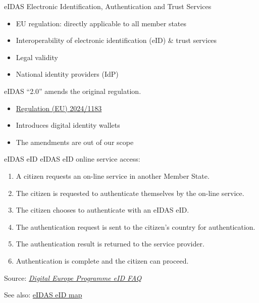 \begin{frame}{eIDAS}
  Electronic Identification, Authentication and Trust Services
  \begin{itemize}[<+(1)->]
    \item EU regulation: directly applicable to all member states
    \item Interoperability of electronic identification (eID) \& trust services
    \item Legal validity
    \item National identity providers (IdP)
  \end{itemize}

  \vfill

  \pause
  eIDAS \enquote{2.0} amends the original regulation.
  \begin{itemize}[<+(1)->]
    \item \href{https://eur-lex.europa.eu/eli/reg/2024/1183/oj}{Regulation (EU) 2024/1183}
    \item Introduces digital identity wallets
    \item The amendments are out of our scope
  \end{itemize}
\end{frame}

\begin{frame}{eIDAS eID}
  eIDAS eID online service access:
  \begin{enumerate}[<+(1)->]
    \item A citizen requests an on-line service in another Member State.
    \item The citizen is requested to authenticate themselves by the on-line service.
    \item The citizen chooses to authenticate with an eIDAS eID.
    \item The authentication request is sent to the citizen's country for authentication.
    \item The authentication result is returned to the service provider.
    \item Authentication is complete and the citizen can proceed.
  \end{enumerate}

  \pause
  {\scriptsize Source: \href{https://ec.europa.eu/digital-building-blocks/sites/display/DIGITAL/eID}{\textit{Digital Europe Programme eID FAQ}}}

  \pause
  See also: \href{https://www.eid.as/tsp-map/}{eIDAS eID map}
\end{frame}

